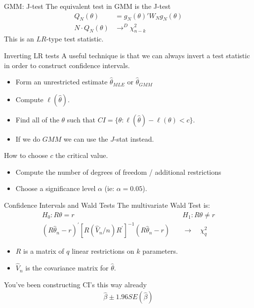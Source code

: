 \documentclass[aspectratio=169]{beamer}
\begin{document}
\begin{frame}{GMM: J-test}
The equivalent test in GMM is the \alert{J-test}
\begin{align*}
Q_N(\theta)&=g_N(\theta)' W_N  g_N(\theta) \\
N \cdot Q_N(\theta) &\rightarrow^D \chi^2_{n-k}
\end{align*}
This is an $LR$-type test statistic.
\end{frame}


\begin{frame}{Inverting LR tests}
A useful technique is that we can always \alert{invert} a test statistic in order to construct confidence intervals.
\begin{itemize}
\item Form an unrestricted estimate $\widehat{\theta}_{MLE}$ or $\widehat{\theta}_{GMM}$
\item Compute $\ell(\widehat{\theta})$.
\item Find all of the $\theta$ such that  $CI=\{\theta: \ell(\widehat{\theta}) -  \ell(\theta) < c \}$.
\item If we do $GMM$ we can use the $J$-stat instead.
\end{itemize}
How to choose $c$ the \alert{critical value}.
\begin{itemize}
\item Compute the number of degrees of freedom / additional restrictions
\item Choose a significance level $\alpha$ (ie: $\alpha=0.05$).
\end{itemize}
\end{frame}


\begin{frame}{Confidence Intervals and Wald Tests}
The multivariate Wald Test is:
\begin{align*}
H_{0}: R \theta=r \quad &
H_{1}: R \theta \neq r\\
\left(R \hat{\theta}_{n}-r\right)^{\prime}\left[R\left(\hat{V}_{n} / n\right) R^{\prime}\right]^{-1}\left(R \hat{\theta}_{n}-r\right) \quad &\rightarrow \quad \chi_{q}^{2}
\end{align*}
\begin{itemize}
\item $R$ is a matrix of $q$ linear restrictions on $k$ parameters.
\item $\hat{V}_n$ is the covariance matrix for $\widehat{\theta}$.
\end{itemize}
You've been constructing CI's this way already
\begin{align*}
\widehat{\beta} \pm 1.96 SE(\widehat{\beta})
\end{align*}
\end{frame}
\end{document}
